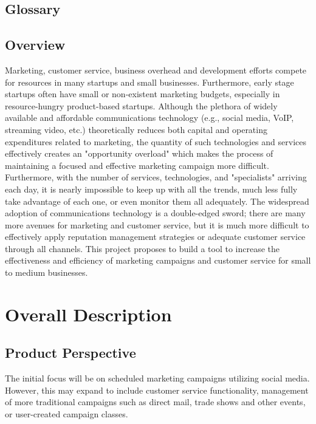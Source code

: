 \documentclass{report}
\begin{document}
\subsection{Glossary} %
\subsection{Overview} %

Marketing, customer service, business overhead and development efforts
compete for resources in many startups and small
businesses. Furthermore, early stage startups often have small or
non-existent marketing budgets, especially in resource-hungry
product-based startups. Although the plethora of widely available and
affordable communications technology (e.g., social media, VoIP,
streaming video, etc.) theoretically reduces both capital and
operating expenditures related to marketing, the quantity of such
technologies and services effectively creates an "opportunity
overload" which makes the process of maintaining a focused and
effective marketing campaign more difficult. Furthermore, with the
number of services, technologies, and "specialists" arriving each day,
it is nearly impossible to keep up with all the trends, much less
fully take advantage of each one, or even monitor them all
adequately. The widespread adoption of communications technology is a
double-edged sword; there are many more avenues for marketing and
customer service, but it is much more difficult to effectively apply
reputation management strategies or adequate customer service through
all channels. This project proposes to build a tool to increase the
effectiveness and efficiency of marketing campaigns and customer
service for small to medium businesses.

\section{Overall Description}
     \subsection{Product Perspective} %

The initial focus will be on scheduled marketing campaigns utilizing
social media. However, this may expand to include customer service
functionality, management of more traditional campaigns such as
direct mail, trade shows and other events, or user-created campaign
classes.
 
\end{document}
